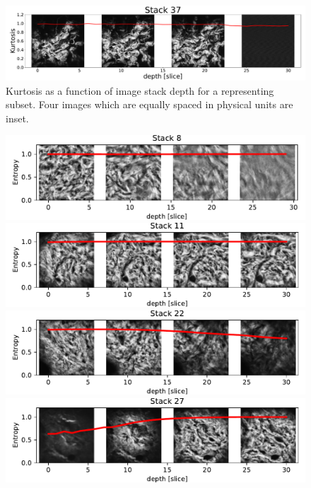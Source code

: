\begin{figure}
    \includegraphics[width=\linewidth]{skinstression/images/kurtosis/37.pdf}
    \caption[Kurtosis vs image stack depth]{
        Kurtosis as a function of image stack depth for a representing subset.
        Four images which are equally spaced in physical units are inset.
    }
    \label{fig:skin_kurtosis_depth}
\end{figure}

\begin{figure}
    \centering
    \includegraphics[width=\linewidth]{skinstression/images/entropy/8.pdf} \\
    \includegraphics[width=\linewidth]{skinstression/images/entropy/11.pdf} \\
    \includegraphics[width=\linewidth]{skinstression/images/entropy/22.pdf} \\
    \includegraphics[width=\linewidth]{skinstression/images/entropy/27.pdf} \\

\end{figure}
